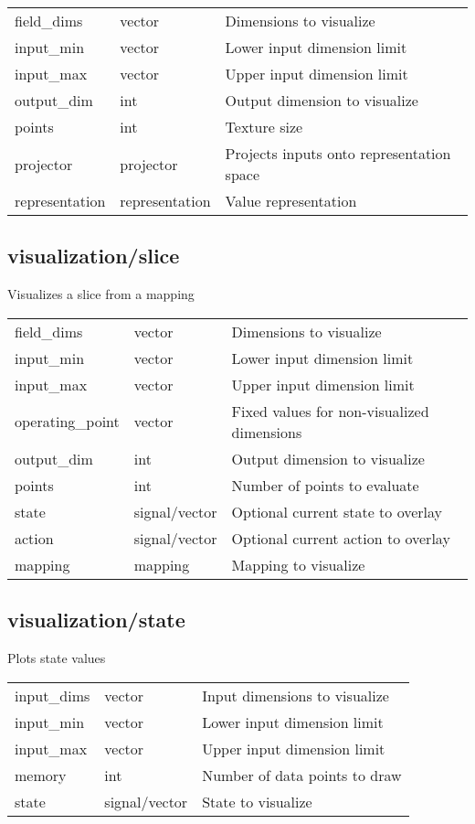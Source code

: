 \noindent\begin{tabular}{@{}lll@{}}
field\_dims&vector&Dimensions to visualize\\
input\_min&vector&Lower input dimension limit\\
input\_max&vector&Upper input dimension limit\\
output\_dim&int&Output dimension to visualize\\
points&int&Texture size\\
projector&projector&Projects inputs onto representation space\\
representation&representation&Value representation\\
\end{tabular}
\subsection{visualization/slice}
\noindent Visualizes a slice from a mapping\\

\noindent\begin{tabular}{@{}lll@{}}
field\_dims&vector&Dimensions to visualize\\
input\_min&vector&Lower input dimension limit\\
input\_max&vector&Upper input dimension limit\\
operating\_point&vector&Fixed values for non-visualized dimensions\\
output\_dim&int&Output dimension to visualize\\
points&int&Number of points to evaluate\\
state&signal/vector&Optional current state to overlay\\
action&signal/vector&Optional current action to overlay\\
mapping&mapping&Mapping to visualize\\
\end{tabular}
\subsection{visualization/state}
\noindent Plots state values\\

\noindent\begin{tabular}{@{}lll@{}}
input\_dims&vector&Input dimensions to visualize\\
input\_min&vector&Lower input dimension limit\\
input\_max&vector&Upper input dimension limit\\
memory&int&Number of data points to draw\\
state&signal/vector&State to visualize\\
\end{tabular}
